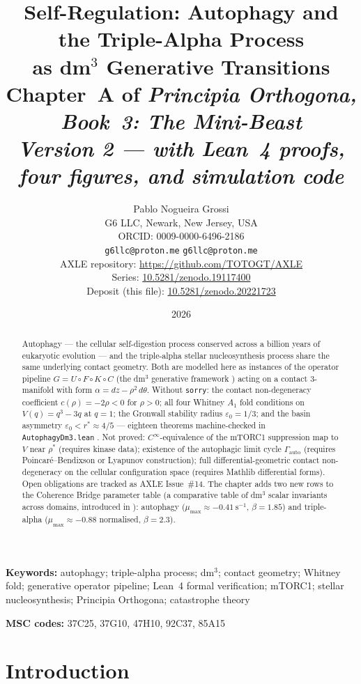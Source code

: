 \documentclass[12pt,a4paper]{article}
\title{%
  \textbf{Self-Regulation: Autophagy and the Triple-Alpha Process}\\
  \textbf{as dm$^3$ Generative Transitions}\\[0.4em]
  \large Chapter~A of \textit{Principia Orthogona, Book~3: The Mini-Beast}\\[0.3em]
  \large\emph{Version 2 --- with Lean~4 proofs, four figures, and simulation code}%
}
\author{%
  Pablo Nogueira Grossi\\
  G6 LLC, Newark, New Jersey, USA\\
  ORCID: 0009-0000-6496-2186\\
  \texttt{g6llc@proton.me} \quad \texttt{g6llc@proton.me}\\[0.3em]
  \small AXLE repository: \url{https://github.com/TOTOGT/AXLE}\\
  \small Series: \href{https://doi.org/10.5281/zenodo.19117400}{10.5281/zenodo.19117400}\\
  \small Deposit (this file): \href{https://doi.org/10.5281/zenodo.20221723}{10.5281/zenodo.20221723}%
}
\date{2026}
\begin{document}
\maketitle

\begin{abstract}
Autophagy --- the cellular self-digestion process conserved across a billion
years of eukaryotic evolution --- and the triple-alpha stellar nucleosynthesis
process share the same underlying contact geometry.
Both are modelled here as instances of the operator pipeline
$G = U \circ F \circ K \circ C$ (the dm$^3$ generative framework
\cite{Grossi2026_Vol1}) acting on a contact 3-manifold with form
$\alpha = dz - \rho^2\,d\theta$.
Without \texttt{sorry}: the contact non-degeneracy coefficient
$c(\rho) = -2\rho < 0$ for $\rho > 0$; all four Whitney $A_1$ fold conditions
on $V(q) = q^3 - 3q$ at $q = 1$; the Gronwall stability radius
$\varepsilon_0 = 1/3$; and the basin asymmetry $\varepsilon_0 < r^* \approx
4/5$ --- eighteen theorems machine-checked in \texttt{AutophagyDm3.lean}
\cite{AXLE2026}.
Not proved: $C^\infty$-equivalence of the mTORC1 suppression map to $V$ near
$\rho^*$ (requires kinase data); existence of the autophagic limit cycle
$\Gamma_\mathrm{auto}$ (requires Poincar\'e--Bendixson or Lyapunov
construction); full differential-geometric contact non-degeneracy on the
cellular configuration space (requires Mathlib differential forms).
Open obligations are tracked as AXLE Issue~\#14.
The chapter adds two new rows to the Coherence Bridge parameter table
(a comparative table of dm$^3$ scalar invariants across domains,
introduced in \cite{Grossi2026_Vol1}): autophagy
($\mu_{\max} \approx -0.41~\mathrm{s}^{-1}$, $\beta = 1.85$)
and triple-alpha ($\mu_{\max} \approx -0.88$ normalised, $\beta = 2.3$).
\end{abstract}

\textbf{Keywords:} autophagy; triple-alpha process; dm$^3$; contact
geometry; Whitney fold; generative operator pipeline;
Lean~4 formal verification; mTORC1; stellar nucleosynthesis;
Principia Orthogona; catastrophe theory

\textbf{MSC codes:} 37C25, 37G10, 47H10, 92C37, 85A15

\section{Introduction}
\label{sec:intro}
\end{document}
